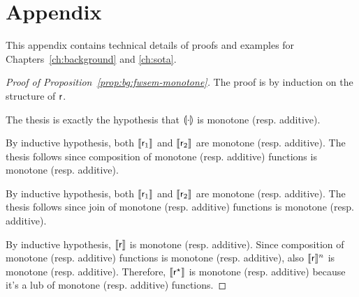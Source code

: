 
\chapter{Appendix}\label{ch:app:bg-sota}
This appendix contains technical details of proofs and examples for Chapters~\ref{ch:background} and \ref{ch:sota}.

\begin{proof}[Proof of Proposition~\ref{prop:bg:fwsem-monotone}]
	The proof is by induction on the structure of $\mathsf{r}$.

	\proofcase{$\expe$}
	The thesis is exactly the hypothesis that $\llparenthesis\cdot\rrparenthesis$ is monotone (resp. additive).

	By inductive hypothesis, both $\llbracket\mathsf{r}_1\rrbracket$ and $\llbracket\mathsf{r}_2\rrbracket$ are monotone (resp. additive). The thesis follows since composition of monotone (resp. additive) functions is monotone (resp. additive).

	By inductive hypothesis, both $\llbracket\mathsf{r}_1\rrbracket$ and $\llbracket\mathsf{r}_2\rrbracket$ are monotone (resp. additive). The thesis follows since join of monotone (resp. additive) functions is monotone (resp. additive).

	\proofcase{$\regr^{\kstar}$}
	By inductive hypothesis, $\llbracket\mathsf{r}\rrbracket$ is monotone (resp. additive). Since composition of monotone (resp. additive) functions is monotone (resp. additive), also $\llbracket\mathsf{r}\rrbracket^n$ is monotone (resp. additive). Therefore, $\llbracket\mathsf{r}^{\star}\rrbracket$ is monotone (resp. additive) because it's a lub of monotone (resp. additive) functions.
\end{proof}
